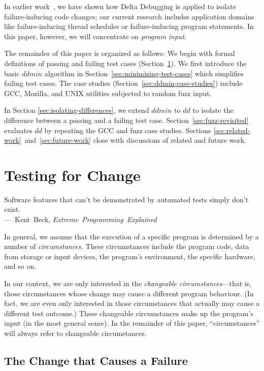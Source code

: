 \documentclass{acm_proc_article-sp}
\newcommand{\GCC}        {{\small GCC}\xspace}
\newcommand{\UNIX}       {{\small UNIX}\xspace}
\newcommand{\dd}{\textit{dd}\xspace}
\newcommand{\ddmin}{\textit{ddmin}\xspace}
\newenvironment{Quote}{%
\smallskip
\begin{minipage}[t]{\columnwidth}
\begin{flushright}%
\itshape%
\samepage%
}{\end{flushright}\end{minipage}\par}
\newcommand{\By}[2]{\\[1mm]---~\mbox{\textnormal{#1}} \mbox{\textsl{#2}}}
\theoremstyle{plain}
\begin{document}
In earlier work~\cite{zeller/99/esec}, we have shown how Delta
Debugging is applied to isolate failure-inducing code changes; our
current research includes application domains like failure-inducing
thread schedules or failure-inducing program statements.  In this
paper, however, we will concentrate on \emph{program input}.

The remainder of this paper is organized as follows: We begin with
formal definitions of passing and failing test cases
(Section~\ref{sec:tests-and-changes}).  We first introduce the basic
$\ddmin$ algorithm in Section~\ref{sec:minimizing-test-cases} which
simplifies failing test cases.  The case studies
(Section~\ref{sec:ddmin-case-studies}) include \GCC, Mozilla, and
\UNIX utilities subjected to random fuzz input.

In Section \ref{sec:isolating-differences}, we extend $\ddmin$ to
$\dd$ to isolate the difference between a passing and a failing test
case.  Section~\ref{sec:fuzz-revisited} evaluates $\dd$ by repeating
the \GCC and fuzz case studies.  Sections
\ref{sec:related-work}~and~\ref{sec:future-work} close with
discussions of related and future work.


\section{Testing for Change}
\label{sec:tests-and-changes}

\begin{Quote}
  Software features that can't be demonstrated by automated tests
  simply don't exist.
\By{Kent Beck,}{Extreme Programming Explained} %
\end{Quote}

In general, we assume that the execution of a specific program is
determined by a number of \emph{circumstances.}  These circumstances
include the program code, data from storage or input devices, the
program's environment, the specific hardware, and so on.

In our context, we are only interested in the \emph{changeable
  circumstances}---that is, those circumstances whose change may cause
a different program behaviour.  (In fact, we are even only interested
in those circumstances that actually may cause a different test
outcome.)  These changeable circumstances make up the program's input
(in the most general sense).  In the remainder of this paper,
``circumstances'' will always refer to changeable circumstances.

\subsection{The Change that Causes a Failure}
\end{document}
